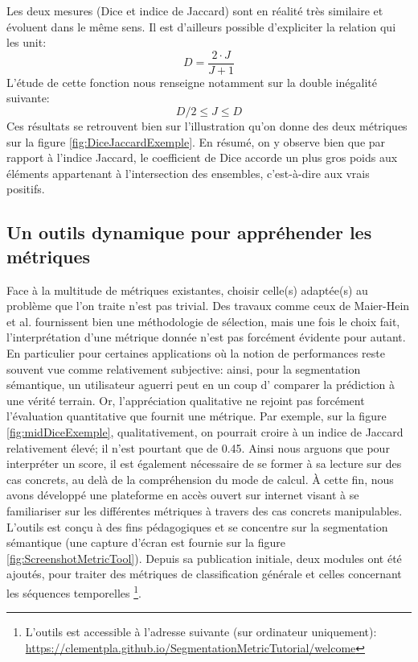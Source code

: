 Les deux mesures (Dice et indice de Jaccard) sont en réalité très similaire et évoluent dans le même sens. Il est d'ailleurs possible d'expliciter la relation qui les unit:
\begin{equation}
	D = \frac{2 \cdot J}{J+1}
\end{equation} 
L'étude de cette fonction nous renseigne notamment sur la double inégalité suivante:
\begin{equation}
	D / 2 \leq J \leq D
\end{equation}
Ces résultats se retrouvent bien sur l'illustration qu'on donne des deux métriques sur la figure \ref{fig:DiceJaccardExemple}. En résumé, on y observe bien que par rapport à l'indice Jaccard, le coefficient  de Dice accorde un plus gros poids aux éléments appartenant à l'intersection des ensembles, c'est-à-dire aux vrais positifs.
\subsection{Un outils dynamique pour appréhender les métriques}
Face à la multitude de métriques existantes, choisir celle(s) adaptée(s) au problème que l'on traite n'est pas trivial. Des travaux comme ceux de Maier-Hein et al. \cite{maier-heinMetricsReloadedPitfalls2022} fournissent bien une méthodologie de sélection, mais une fois le choix fait, l'interprétation d'une métrique donnée n'est pas forcément évidente pour autant. En particulier pour certaines applications où la notion de performances reste souvent vue comme relativement subjective: ainsi, pour la segmentation sémantique, un utilisateur aguerri peut en un coup d'\oeil{} comparer la prédiction à une vérité terrain. Or, l'appréciation qualitative ne rejoint pas forcément l'évaluation quantitative que fournit une métrique. Par exemple, sur la figure \ref{fig:midDiceExemple}, qualitativement, on pourrait croire à un indice de Jaccard relativement élevé; il n'est pourtant \og que \fg de 0.45. Ainsi nous arguons que pour interpréter un score, il est également nécessaire de se former à sa lecture sur des cas concrets, au delà de la compréhension du mode de calcul. À cette fin, nous avons développé une plateforme en accès ouvert sur internet visant à se familiariser sur les différentes métriques à travers des cas concrets manipulables. L'outils est conçu à des fins pédagogiques et se concentre sur la segmentation sémantique (une capture d'écran est fournie sur la figure \ref{fig:ScreenshotMetricTool}). Depuis sa publication initiale, deux modules ont été ajoutés, pour traiter des métriques de classification générale et celles concernant les séquences temporelles \footnote{L'outils est accessible à l'adresse suivante (sur ordinateur uniquement): \url{https://clementpla.github.io/SegmentationMetricTutorial/welcome}}.
